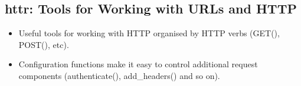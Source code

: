 \subsection{httr: Tools for Working with URLs and HTTP}

\begin{itemize}
\item Useful tools for working with HTTP organised by HTTP verbs (GET(), POST(), etc). 

\item Configuration functions make it easy to control additional request components (authenticate(), add_headers() and so on).

\end{itemize}
